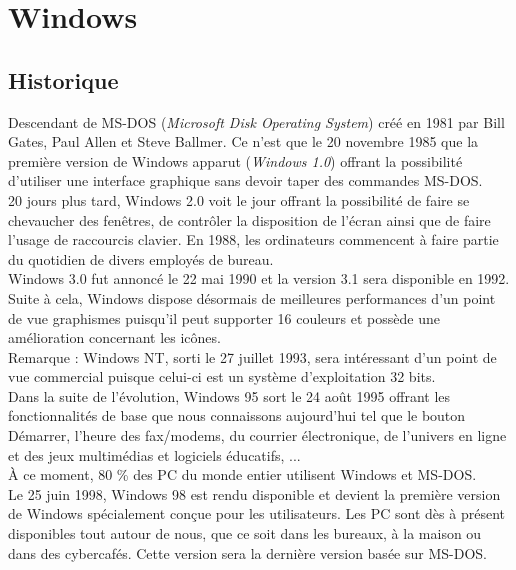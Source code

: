 \section{Windows}
\subsection{Historique}
Descendant de MS-DOS (\textit{Microsoft Disk Operating System}) créé en 1981
par Bill Gates, Paul Allen et Steve Ballmer. Ce n'est que le 20 novembre 1985
que la première version de Windows apparut (\textit{Windows 1.0}) offrant la
possibilité d'utiliser une interface graphique sans devoir taper des commandes
MS-DOS. \\

20 jours plus tard, Windows 2.0 voit le jour offrant la possibilité de faire se
chevaucher des fenêtres, de contrôler la disposition de l'écran ainsi que de
faire l'usage de raccourcis clavier. En 1988, les ordinateurs commencent à
faire partie du quotidien de divers employés de bureau. \\

Windows 3.0 fut annoncé le 22 mai 1990 et la version 3.1 sera disponible en
1992. Suite à cela, Windows dispose désormais de meilleures performances d'un
point de vue graphismes puisqu'il peut supporter 16 couleurs et possède une
amélioration concernant les icônes. \\

Remarque : Windows NT, sorti le 27 juillet 1993, sera intéressant d'un point de
vue commercial puisque celui-ci est un système d'exploitation 32 bits. \\

Dans la suite de l'évolution, Windows 95 sort le 24 août 1995 offrant les
fonctionnalités de base que nous connaissons aujourd'hui tel que le bouton
Démarrer, l'heure des fax/modems, du courrier électronique, de l'univers en
ligne et des jeux multimédias et logiciels éducatifs, ... \\

À ce moment, 80 \% des PC du monde entier utilisent Windows et MS-DOS. \\

Le 25 juin 1998, Windows 98 est rendu disponible et devient la première
version de Windows spécialement conçue pour les utilisateurs. Les PC sont dès à
présent disponibles tout autour de nous, que ce soit dans les bureaux, à la
maison ou dans des cybercafés. Cette version sera la dernière version basée sur
MS-DOS. \\

